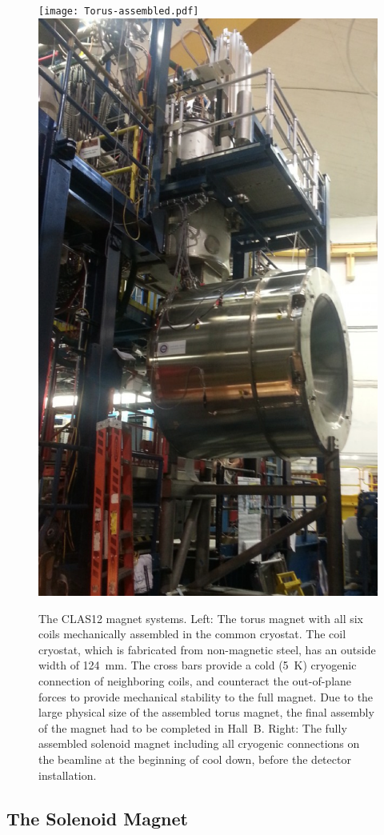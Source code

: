 \documentclass[final,3p,twocolumn]{elsarticle}
\begin{document}
\begin{figure}[ht]
\hspace{-0.5cm}\centerline{\texttt{[image: Torus-assembled.pdf]}
\includegraphics[width=0.76\columnwidth]{solenoid-magnet.png}}
\caption{The CLAS12 magnet systems. Left: The torus magnet with all six coils mechanically assembled in the
  common cryostat. The coil cryostat, which is fabricated from non-magnetic steel, has an outside width of 124~mm.
  The cross bars provide a cold (5~K) cryogenic connection of neighboring coils, and counteract the out-of-plane
  forces to provide mechanical stability to the full magnet. Due to the large physical size of the assembled torus
  magnet, the final assembly of the magnet had to be completed in Hall~B. Right: The fully assembled solenoid magnet
  including all cryogenic connections on the beamline at the beginning of cool down, before the detector installation.}
\label{clas12-magnets}
\end{figure}

\subsection{The Solenoid Magnet}
\end{document}
